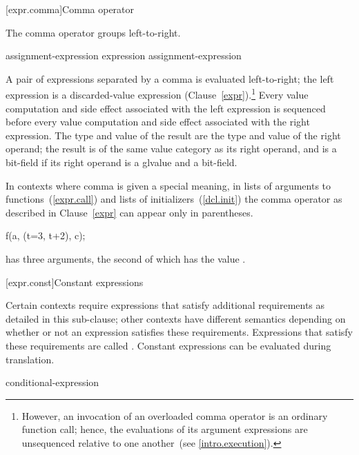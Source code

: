 [expr.comma]{Comma operator}%
%
%
%
%

\pnum
The comma operator groups left-to-right.

\begin{bnf}
\br
    assignment-expression\br
    expression \terminal{,} assignment-expression
\end{bnf}

A pair of expressions separated by a comma is evaluated left-to-right;
the left expression is
a discarded-value expression (Clause~\ref{expr}).\footnote{However, an
invocation of an overloaded comma operator is an ordinary function call; hence,
the evaluations of its argument expressions are unsequenced relative to one
another~(see \ref{intro.execution}).}
Every
%
value computation and side effect
associated with the left expression is sequenced before every value
computation and side effect associated with the right expression.
%
The type and value of the
result are the type and value of the right operand; the result is of the same
value category as its right operand, and is a bit-field if its
right operand is a glvalue and a bit-field.

\pnum
In contexts where comma is given a special meaning, \enterexample in
lists of arguments to functions~(\ref{expr.call}) and lists of
initializers~(\ref{dcl.init}) \exitexample the comma operator as
described in Clause~\ref{expr} can appear only in parentheses.
\enterexample 

\begin{codeblock}
f(a, (t=3, t+2), c);
\end{codeblock}

has three arguments, the second of which has the value
.
\exitexample 

[expr.const]{Constant expressions}%

\pnum
Certain contexts require expressions that satisfy additional
requirements as detailed in this sub-clause; other contexts have different
semantics depending on whether or not an expression satisfies these requirements.
Expressions that satisfy these requirements are called 
. \enternote Constant expressions can be evaluated
during translation.\exitnote

\begin{bnf}
\br
    conditional-expression
\end{bnf}

